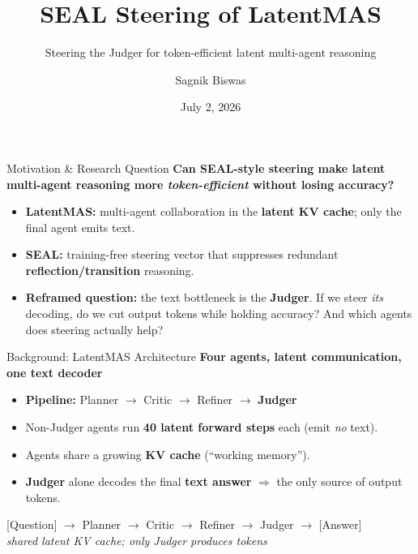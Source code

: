 \documentclass{beamer}
\title{SEAL Steering of LatentMAS}
\subtitle{Steering the Judger for token-efficient latent multi-agent reasoning}
\author{Sagnik Biswas}
\date{July 2, 2026}
\begin{document}
\begin{frame}
    \titlepage
    \vspace{-1cm}
\end{frame}

\begin{frame}{Motivation \& Research Question}
    \textbf{Can SEAL-style steering make latent multi-agent reasoning more \emph{token-efficient} without losing accuracy?}
    \begin{itemize}
        \item \textbf{LatentMAS:} multi-agent collaboration in the \textbf{latent KV cache}; only the final agent emits text.
        \item \textbf{SEAL:} training-free steering vector that suppresses redundant \textbf{reflection/transition} reasoning.
        \item \textbf{Reframed question:} the text bottleneck is the \textbf{Judger}. If we steer \emph{its} decoding, do we cut output tokens while holding accuracy? And which agents does steering actually help?
    \end{itemize}
\end{frame}

\begin{frame}{Background: LatentMAS Architecture}
    \textbf{Four agents, latent communication, one text decoder}
    \begin{itemize}
        \item \textbf{Pipeline:} Planner $\rightarrow$ Critic $\rightarrow$ Refiner $\rightarrow$ \textbf{Judger}
        \item Non-Judger agents run \textbf{40 latent forward steps} each (emit \emph{no} text).
        \item Agents share a growing \textbf{KV cache} (``working memory'').
        \item \textbf{Judger} alone decodes the final \textbf{text answer} $\Rightarrow$ the only source of output tokens.
    \end{itemize}
    \vspace{0.4cm}
    \begin{center}
        [Question] $\rightarrow$ Planner $\rightarrow$ Critic $\rightarrow$ Refiner $\rightarrow$ Judger $\rightarrow$ [Answer] \\
        \textit{shared latent KV cache; only Judger produces tokens}
    \end{center}
\end{frame}
\end{document}
